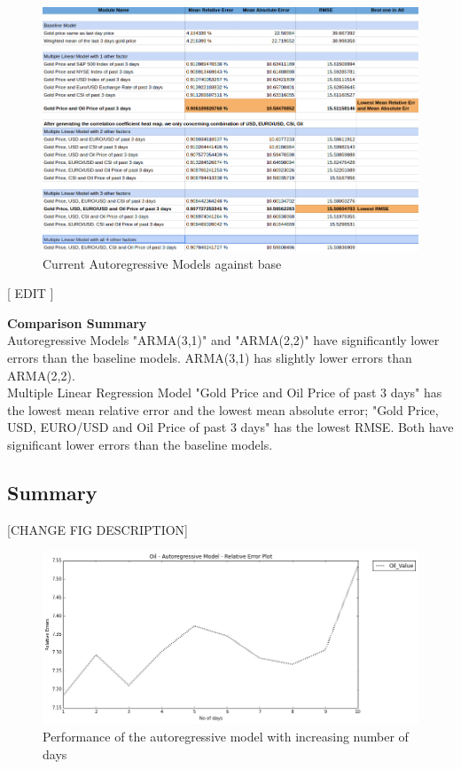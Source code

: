\documentclass[runningheads]{llncs}
\begin{document}
\begin{figure}
\centering
\includegraphics[width=\textwidth]{GoldMLRAgainstBase_Daily.png}
\caption{Current Autoregressive Models against base}
\label{fig:GoldMLRAgainstBase_Daily.png}
\end{figure}

[ EDIT ]

\noindent\textbf{Comparison Summary} \\
Autoregressive Models "ARMA(3,1)" and "ARMA(2,2)" have significantly lower errors than the baseline models. ARMA(3,1) has slightly lower errors 
than ARMA(2,2). \\
Multiple Linear Regression Model "Gold Price and Oil Price of past 3 days" has the lowest mean relative error and the lowest mean absolute error; 
 "Gold Price, USD, EURO/USD and Oil Price of past 3 days" has the lowest RMSE.
Both have significant lower errors than the baseline models. \\

\subsection{Summary}

[CHANGE FIG DESCRIPTION]
\begin{figure}
\centering
\includegraphics[width=\textwidth]{oil_autoregressive.png}
\caption{Performance of the autoregressive model with increasing number of days}
\label{fig:oil_autoregressive.png}
\end{figure}
\end{document}
